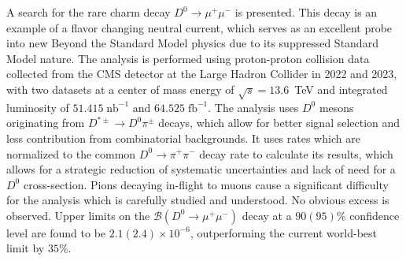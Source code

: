 %
%

A search for the rare charm decay $D^0 \to \mu^+ \mu^-$ is presented. This decay is an example of a flavor changing neutral current, which serves as an excellent probe into new Beyond the Standard Model physics due to its suppressed Standard Model nature. The analysis is performed using proton-proton collision data collected from the CMS detector at the Large Hadron Collider in 2022 and 2023, with two datasets at a center of mass energy of $\sqrt{s} = 13.6$~TeV and integrated luminosity of $51.415\; \text{nb}^{-1}$ and $64.525\; \text{fb}^{-1}$. The analysis uses $D^0$ mesons originating from $D^{*\pm} \to D^0 \pi^\pm$ decays, which allow for better signal selection and less contribution from combinatorial backgrounds. It uses rates which are normalized to the common $D^0 \to \pi^+ \pi^-$ decay rate to calculate its results, which allows for a strategic reduction of systematic uncertainties and lack of need for a $D^0$ cross-section. Pions decaying in-flight to muons cause a significant difficulty for the analysis which is carefully studied and understood. No obvious excess is observed. Upper limits on the $\mathcal{B}(D^0 \to \mu^+ \mu^-)$ decay at a $90(95)\%$ confidence level are found to be $2.1(2.4)\times10^{-6}$, outperforming the current world-best limit by $35\%$. 